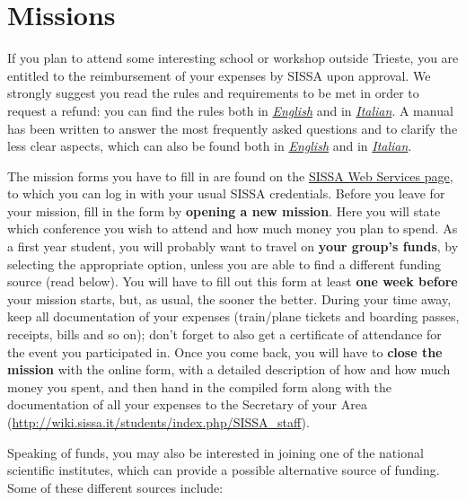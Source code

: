 \documentclass{sissavademecum}
\begin{document}
\section{Missions}

If you plan to attend some interesting school or workshop outside Trieste, you are entitled to the reimbursement of your expenses by SISSA upon approval. We strongly suggest you read the rules and requirements to be met in order to request a refund: you can find the rules both in \href{https://services.sissa.it/mission/doc/English/ENGLISH_VERSION_REGOLAMENTO_MISSIONI.pdf}{\emph{English}} and in \href{https://services.sissa.it/mission/doc/Italian/2019_REGOLAMENTO_MISSIONI.pdf}{\emph{Italian}}. A manual has been written to answer the most frequently asked questions and to clarify the less clear aspects, which can also be found both in \href{https://services.sissa.it/mission/doc/English/ENGLISH_VERSION_USERS_GUIDE_C_i__PhD.pdf}{\emph{English}} and in \href{https://services.sissa.it/mission/doc/Italian/MANUALE_C_(i)__PHD.pdf}{\emph{Italian}}.

The mission forms you have to fill in are found on the \href{https://services.sissa.it/online/}{SISSA Web Services page},
to which you can log in with your usual SISSA credentials. Before you leave for your mission, fill in the form by \textbf{opening a new mission}. Here you will state which conference you wish to attend and how much money you plan to spend. As a first year student, you will probably want to travel on\textbf{ your group's funds}, by selecting the appropriate option, unless you are able to find a different funding source (read below). You will have to fill out this form at least \textbf{one week before} your mission starts, but, as usual, the sooner the better. During your time away, keep all documentation of your expenses (train/plane tickets and boarding passes, receipts, bills and so on); don't forget to also get a certificate of attendance for the event you participated in. Once you come back, you will have to \textbf{close the mission} with the online form, with a detailed description of how and how much money you spent, and then hand in the compiled form along with the documentation of all your expenses to the Secretary of your Area (\url{http://wiki.sissa.it/students/index.php/SISSA_staff}).

Speaking of funds, you may also be interested in joining one of the national scientific institutes, which can provide a possible alternative source of funding. Some of these different sources include:
\end{document}
